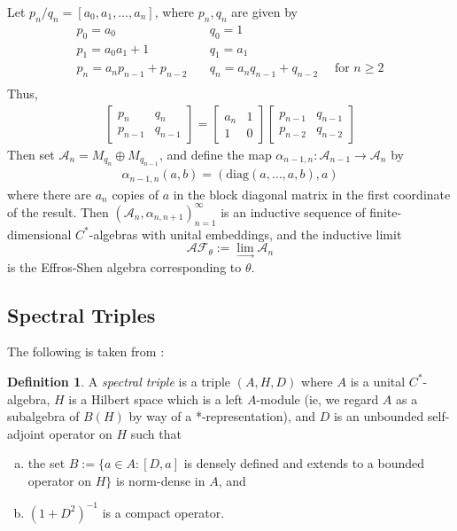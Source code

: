 \documentclass[12pt]{amsart}
\newcommand{\diag}[1]{\text{diag}(#1)}
\newcommand{\AF}{\mathcal{A}\mathcal{F}}
\newcommand{\mc}[1]{\mathcal{#1}}
\theoremstyle{plain} %
\theoremstyle{definition} %
\newtheorem{Definition}[Theorem]{Definition}
\begin{document}
Let $p_n/q_n = [a_0, a_1, \dots, a_n]$, where $p_n, q_n$ are given by
$$\begin{array}{ll}
     p_0 = a_0 \quad& q_0 = 1  \\
     p_1 = a_0 a_1 + 1 \quad& q_1 = a_1\\ 
     p_n = a_n p_{n-1} + p_{n-2} \quad& q_n = a_n q_{n-1} + q_{n-2} \quad \text{ for } n \geq 2 \\
\end{array}$$
Thus,
\begin{align*}
    \begin{bmatrix}
    p_n & q_n \\ p_{n-1} & q_{n-1}
    \end{bmatrix}
    = \begin{bmatrix}
    a_n & 1 \\ 1 & 0
    \end{bmatrix}
    \begin{bmatrix}
    p_{n-1} & q_{n-1} \\ p_{n-2} & q_{n-2}
    \end{bmatrix}
\end{align*}
Then set $\mc{A}_n = M_{q_n} \oplus M_{q_{n-1}}$, and define the map $\alpha_{n-1, n}: \mc{A}_{n-1} \to \mc{A}_{n}$ by
\begin{align*}
    \alpha_{n-1,n}(a,b) = (\diag{a, \dots, a, b}, a)
\end{align*}
where there are $a_n$ copies of $a$ in the block diagonal matrix in the first coordinate of the result. Then $(\mc{A}_n, \alpha_{n,n+1})_{n=1}^{\infty}$ is an inductive sequence of finite-dimensional $C^*$-algebras with unital embeddings, and the inductive limit $$\AF_{\theta} := \lim_{\longrightarrow} \mc{A}_n$$ is the Effros-Shen algebra corresponding to $\theta$.


\subsection{Spectral Triples}

The following is taken from \cite{CI06}:
\begin{Definition}\label{spectral triple def}
A \textit{spectral triple} is a triple $(A, H, D)$ where $A$ is a unital $C^*$-algebra, $H$ is a Hilbert space which is a left $A$-module (ie, we regard $A$ as a subalgebra of $B(H)$ by way of a *-representation), and $D$ is an unbounded self-adjoint operator on $H$ such that
\begin{enumerate}[(a)]
    \item the set $B := \{a \in A: [D,a]$ is densely defined and extends to a bounded operator on $H\}$ is norm-dense in $A$, and
    
    \item $(1 + D^2)^{-1}$ is a compact operator.
\end{enumerate}
\end{Definition}
\end{document}
